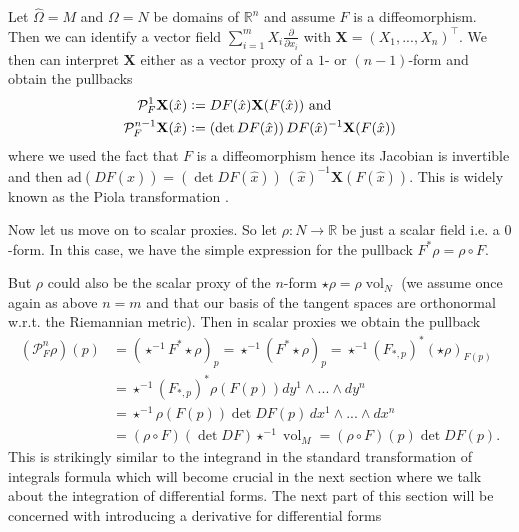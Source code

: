 \documentclass[12pt,a4paper]{article}
\numberwithin{equation}{subsection}
\numberwithin{lemma}{subsection}
\theoremstyle{definition}
\DeclareMathOperator{\vol}{vol}
\newcommand{\real}{\mathbb{R}}
\begin{document}
Let $\hat{\Omega} = M$ and $\Omega = N$ be domains of $\real^n$ and assume 
$F$ is a diffeomorphism. Then we 
can identify a vector field $\sum_{i=1}^m X_i \frac{\partial}{\partial x_i}$
with $\mathbf{X} = (X_1,...,X_n)^\top$. We then can interpret $\mathbf{X}$ 
either as a vector proxy of a $1$- or $(n-1)$-form and obtain the pullbacks
\begin{align*}
    \mathcal{P}^1_F \mathbf{X}(\hat{x}) &\vcentcolon= DF(\hat{x}) \mathbf{X}(F(\hat{x})) \text{ and}
    \\ \mathcal{P}^{n-1}_F \mathbf{X}(\hat{x}) &\vcentcolon= (\det DF(\hat{x}))\,
        DF(\hat{x})^{-1} \mathbf{X}(F(\hat{x}))
\end{align*}
where we used the fact that $F$ is a diffeomorphism hence its Jacobian 
is invertible and then $\text{ad}(DF(\hat{x})) = (\det DF(\hat{x}))\,
(\hat{x})^{-1} \mathbf{X}(F(\hat{x}))$.
This is widely known as the Piola transformation \cite[Def.\,9.8]{ern_guermond}.

Now let us move on to scalar proxies. So let $\rho: N \rightarrow \real$ be 
just a scalar field i.e. a $0$-form. In this case, we 
have the simple expression for the pullback $F^* \rho = \rho \circ F$. 

But $\rho$ could also be the scalar proxy of the $n$-form 
$\star \rho = \rho \vol_N$ (we assume once again 
as above
$n=m$ and that our basis of the tangent spaces are orthonormal w.r.t. the 
Riemannian metric). Then in scalar proxies we obtain the pullback
\begin{align*}
    (\mathcal{P}_F^n \rho )(p) 
    &= (\star ^{-1}F^* \star \rho)_p
    = \star ^{-1} (F^* \star \rho)_p
    = \star ^{-1} (F_{*,p})^* (\star \rho)_{F(p)}
    \\ &= \star ^{-1} (F_{*,p})^* \rho(F(p)) dy^1 \wedge ... \wedge dy^n
    \\ &= \star ^{-1} \rho(F(p)) \det DF(p) \, dx^1 \wedge ... \wedge dx^n
    \\ &=  (\rho \circ F) (\det DF) \star^{-1}\vol_M
    = (\rho \circ F)(p) \det DF(p).
\end{align*}
This is strikingly similar to the integrand in the standard transformation 
of integrals formula which will become crucial in the next section
where we talk about the
integration of differential forms. The next part of this section will be 
concerned with introducing a derivative for differential forms
\end{document}

